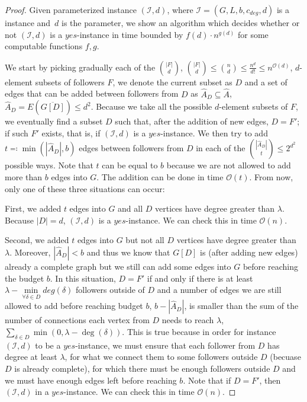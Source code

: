 \begin{proof}\label{proof:XPd}
    Given parameterized instance $(\mathcal{I}, d)$, where $\mathcal{I} = (G, L, b, c_{deg}, d)$ is a \HLdeg instance and~$d$ is the parameter,
    we show an algorithm which decides whether or not $(\mathcal{I}, d)$ is a $yes$-instance in time bounded by
    $f(d) \cdot n^{g(d)}$ for some computable functions $f,g$.

    We start by picking gradually each of the $\binom{|F|}{d}$,
    $\binom{|F|}{d} \leq \binom{n}{d} \leq \frac{n^{d}}{d!} \leq n^{\mathcal{O}(d)}$,
    $d$-element subsets of followers $F$,
    we denote the current subset as $D$ and a set of edges that can be added between followers from $D$
    as $\hat{A}_D \subseteq \hat{A}$, $\hat{A}_D = E(\overline{G[D]}) \leq d^2$.
    Because we take all the possible $d$-element subsets of $F$, we eventually find a subset $D$ such that,
    after the addition of new edges, $D = F'$;
    if such $F'$ exists, that is, if $(\mathcal{I}, d)$ is a $yes$-instance.
    We then try to add $t \eqqcolon \min(|\hat{A}_D|, b)$ edges between followers from $D$
    in each of the $\binom{|\hat{A}_D|}{t} \leq 2^{d^2}$ possible ways.
    Note that $t$ can be equal to $b$ because we are not allowed to add more than $b$ edges into $G$.
    The addition can be done in time $\mathcal{O}(t)$.
    From now, only one of these three situations can occur:

    First, we added $t$ edges into $G$ and all $D$ vertices have degree greater than $\lambda$.
    Because $|D| = d$, $(\mathcal{I}, d)$ is a $yes$-instance.
    We can check this in time $\mathcal{O}(n)$.
    
    Second, we added $t$ edges into $G$ but not all $D$ vertices have degree greater than $\lambda$.
    Moreover, $|\hat{A}_D| < b$ and thus we know that $G[D]$ is (after adding new edges) already a complete graph
    but we still can add some edges into $G$ before reaching the budget $b$. 
    In this situation, $D = F'$ if and only if there is at least $\lambda - \min\limits_{\forall \delta \in D}deg(\delta)$ followers
    outside of $D$ and a number of edges we are still allowed to add before reaching budget $b$, $b - |\hat{A}_D|$,
    is smaller than the sum of the number of connections each vertex from $D$ needs to reach $\lambda$,
    $\sum_{\delta \in D} \min(0, \lambda - \deg(\delta))$.
    This is true because in order for instance $(\mathcal{I}, d)$ to be a $yes$-instance, we must
    ensure that each follower from $D$ has degree at least $\lambda$, for what we connect them to some followers
    outside $D$ (becuase $D$ is already complete), for which there must be enough followers outside $D$ and
    we must have enough edges left before reaching $b$.
    Note that if $D = F'$, then $(\mathcal{I}, d)$ in a $yes$-instance.
    We can check this in time $\mathcal{O}(n)$.
    

\end{proof}
